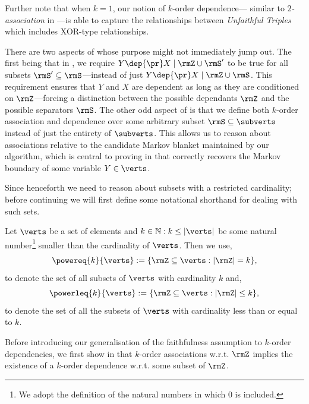 \documentclass[accepted]{uai2026} %
\theoremstyle{plain}
\theoremstyle{definition}
\theoremstyle{remark}
\begin{document}
Further note that when $k=1$, our notion of $k$-order dependence---
similar to \emph{$2$-association} in \citet[Definition 6]{marx2021}---is
able to capture the relationships between \emph{Unfaithful Triples}
which includes XOR-type relationships.

There are two aspects of  whose purpose might not
immediately jump out. The first being that in , we
require $Y\dep{\pr}X\mid\rmZ\cup\rmS'$ to be true for all subsets
$\rmS'\subseteq\rmS$---instead of just
$Y\dep{\pr}X\mid\rmZ\cup\rmS$. This requirement ensures that $Y$ and $X$
are dependent as long as they are conditioned on $\rmZ$---forcing a
distinction between the possible dependants $\rmZ$ and the possible
separators $\rmS$. The other odd aspect of  is that we
define both $k$-order association and dependence over some arbitrary
subset $\rmS\subseteq\subverts$ instead of just the entirety of
$\subverts$. This allows us to reason about associations relative to
the candidate Markov blanket maintained by our algorithm, which is
central to proving in  that {\method} correctly recovers
the Markov boundary of some variable $Y\in\verts$.

Since henceforth we need to reason about subsets with a restricted
cardinality; before continuing we will first define some notational
shorthand for dealing with such sets.

\begin{definition}\label{def:powerset}
  Let $\verts$ be a set of elements and
  $k\in\mathbb{N} : k\leq |\verts|$ be some natural number\footnote{We
    adopt the definition of the natural numbers in which $0$ is
    included.} smaller than the cardinality of $\verts$. Then we use,
  \begin{equation}
    \label{eq:17}
    \powereq{k}{\verts} := \{\rmZ \subseteq \verts : |\rmZ| = k\},
  \end{equation}
  to denote the set of all subsets of $\verts$ with cardinality $k$
  and,
  \begin{equation}
    \label{eq:18}
    \powerleq{k}{\verts} := \{\rmZ \subseteq \verts : |\rmZ| \leq k\},
  \end{equation}
  to denote the set of all the subsets of $\verts$ with cardinality less
  than or equal to $k$.
\end{definition}

Before introducing our generalisation of the faithfulness
assumption to $k$-order dependencies, we first show in
 that $k$-order associations w.r.t. $\rmZ$
implies the existence of a $k$-order dependence w.r.t. some subset of
$\rmZ$.
\end{document}
